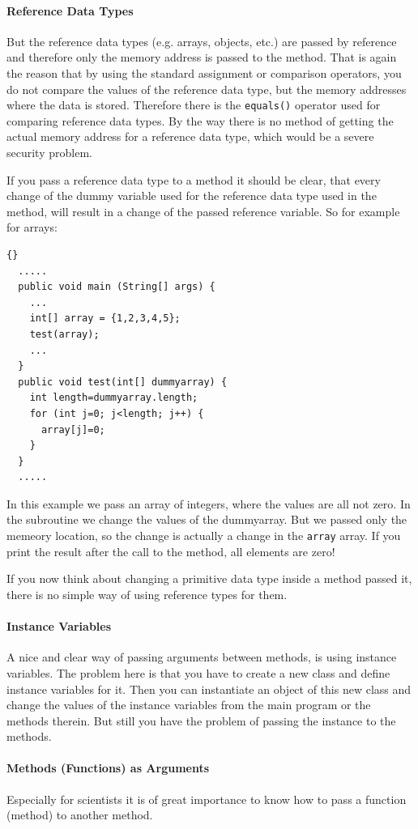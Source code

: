 \paragraph{Reference Data Types}
But the reference data types (e.g. arrays, objects, etc.)
are passed by reference and therefore only the memory
address is passed to the method. That is again the reason that
by using the standard assignment or comparison operators,
you do not compare the values of the reference data type, but
the memory addresses where the data is stored. Therefore there
is the \verb|equals()| operator used for comparing reference data
types. By the way there is no method
of getting the actual memory address for a reference data type,
which would be a severe security problem.

If you pass a reference data type to a method it should be
clear, that every change of the dummy variable used for
the reference data type used in the method, will result in a change
of the passed reference variable. So for example for arrays:
\begin{lstlisting}{}
  .....
  public void main (String[] args) {
    ...
    int[] array = {1,2,3,4,5};
    test(array);
    ...
  }
  public void test(int[] dummyarray) {
    int length=dummyarray.length;
    for (int j=0; j<length; j++) {
      array[j]=0;
    }
  }
  .....
\end{lstlisting}
In this example we pass an array of integers, where the values are all 
not zero. In the subroutine we change the values of the dummyarray.
But we passed only the memeory location, so the change is actually
a change in the \verb|array| array. If you print the result after
the call to the method, all elements are zero!

If you now think about changing a primitive data type inside a method 
passed it, there is no simple way of using reference types for 
them. 

\paragraph{Instance Variables}
A nice and clear way of passing arguments between methods, is
using instance variables. The problem here is that you have
to create a new class and define instance variables for it.
Then you can instantiate an object of this new class and
change the values of the instance variables from the main
program or the methods therein. But still you have the problem
of passing the instance to the methods.

\paragraph{Methods (Functions) as Arguments} 
Especially for scientists it is of great importance to know how
to pass a function (method) to another method.

